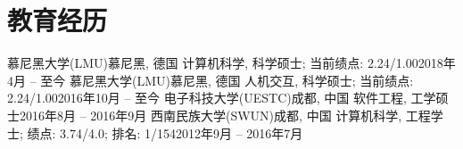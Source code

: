 \section{\textbf{教育经历}}
  \resumeSubHeadingListStart
    \resumeSubheading
      {慕尼黑大学(LMU)}{慕尼黑, 德国}
      {计算机科学, 科学硕士; 当前绩点: 2.24/1.00}{2018年4月 -- 至今}
    \resumeSubheading
      {慕尼黑大学(LMU)}{慕尼黑, 德国}
      {人机交互, 科学硕士; 当前绩点: 2.24/1.00}{2016年10月 -- 至今}
    \resumeSubheading
      {电子科技大学(UESTC)}{成都, 中国}
      {软件工程, 工学硕士}{2016年8月 -- 2016年9月}
    \resumeSubheading
      {西南民族大学(SWUN)}{成都, 中国}
      {计算机科学, 工程学士; 绩点: 3.74/4.0; 排名: 1/154}{2012年9月 -- 2016年7月}
  \resumeSubHeadingListEnd